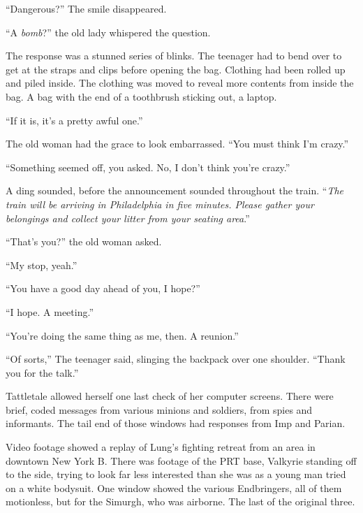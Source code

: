 ``Dangerous?''  The smile disappeared.



``A \emph{bomb}?'' the old lady whispered the question.



The response was a stunned series of blinks.  The teenager had to bend over to get at the straps and clips before opening the bag.  Clothing had been rolled up and piled inside.  The clothing was moved to reveal more contents from inside the bag.  A bag with the end of a toothbrush sticking out, a laptop.



``If it is, it's a pretty awful one.''



The old woman had the grace to look embarrassed.  ``You must think I'm crazy.''



``Something seemed off, you asked.  No, I don't think you're crazy.''



A ding sounded, before the announcement sounded throughout the train.  ``\emph{The train will be arriving in Philadelphia in five minutes.  Please gather your belongings and collect your litter from your seating area}.''



``That's you?'' the old woman asked.



``My stop, yeah.''



``You have a good day ahead of you, I hope?''



``I hope.  A meeting.''



``You're doing the same thing as me, then.  A reunion.''



``Of sorts,'' The teenager said, slinging the backpack over one shoulder.  ``Thank you for the talk.''



\blacksquare



Tattletale allowed herself one last check of her computer screens.  There were brief, coded messages from various minions and soldiers, from spies and informants.  The tail end of those windows had responses from Imp and Parian.



Video footage showed a replay of Lung's fighting retreat from an area in downtown New York B.  There was footage of the PRT base, Valkyrie standing off to the side, trying to look far less interested than she was as a young man tried on a white bodysuit.  One window showed the various Endbringers, all of them motionless, but for the Simurgh, who was airborne.  The last of the original three.



